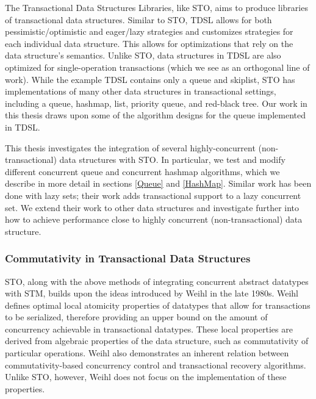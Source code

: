 The Transactional Data Structures Libraries\cite{tdsl}, like STO, aims to produce libraries of transactional data structures. Similar to STO, TDSL allows for both pessimistic/optimistic and eager/lazy strategies and customizes strategies for each individual data structure. This allows for optimizations that rely on the data structure's semantics. Unlike STO, data structures in TDSL are also optimized for single-operation transactions (which we see as an orthogonal line of work). While the example TDSL contains only a queue and skiplist, STO has implementations of many other data structures in transactional settings, including a queue, hashmap, list, priority queue, and red-black tree. Our work in this thesis draws upon some of the algorithm designs for the queue implemented in TDSL.

This thesis investigates the integration of several highly-concurrent (non-transactional) data structures with STO. In particular, we test and modify different concurrent queue \cite{queue1}\cite{queue2}\cite{queue3}\cite{queue4}\cite{queue5}\cite{flatcombining} and concurrent hashmap\cite{hm1}\cite{hm2}\cite{hm3}\cite{chm} algorithms, which we describe in more detail in sections \ref{Queue} and \ref{HashMap}. Similar work has been done with lazy sets\cite{lazyset}; their work adds transactional support to a lazy concurrent set. We extend their work to other data structures and investigate further into how to achieve performance close to highly concurrent (non-transactional) data structure.

\subsubsection{Commutativity in Transactional Data Structures}

STO, along with the above methods of integrating concurrent abstract datatypes with STM, builds upon the ideas introduced by Weihl in the late 1980s\cite{weihl}. Weihl defines optimal local atomicity properties of datatypes that allow for transactions to be serialized, therefore providing an upper bound on the amount of concurrency achievable in transactional datatypes. These local properties are derived from algebraic properties of the data structure, such as commutativity of particular operations. Weihl also demonstrates an inherent relation between commutativity-based concurrency control and transactional recovery algorithms. Unlike STO, however, Weihl does not focus on the implementation of these properties.

